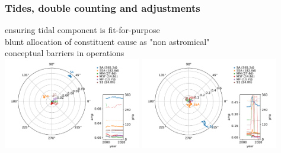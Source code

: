 \begin{frame}
\frametitle{Tides, double counting and adjustments}
ensuring tidal component is fit-for-purpose\\
blunt allocation of constituent cause as "non astromical"\\
conceptual barriers in operations\\
\vfill{}
    \includegraphics[width=0.45\textwidth]{figures/plots/complex_62290.pdf}
    \includegraphics[width=0.45\textwidth]{figures/plots/complex_63540.pdf}
\end{frame}

